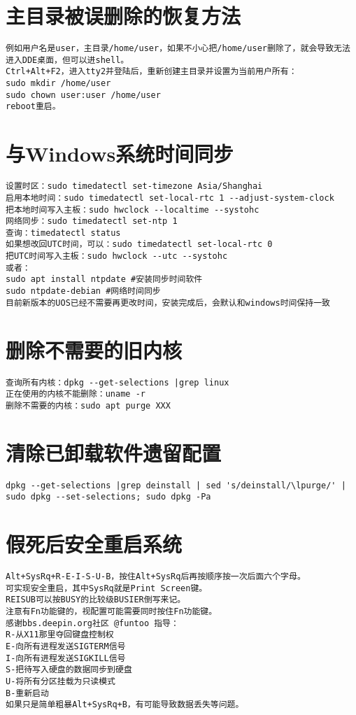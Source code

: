 \documentclass[a4paper,fontset=fandol,zihao=-4,linespread=1.2,oneside]{ctexbook}
\begin{document}
\section{主目录被误删除的恢复方法}
\begin{lstlisting}
例如用户名是user，主目录/home/user，如果不小心把/home/user删除了，就会导致无法进入DDE桌面，但可以进shell。
Ctrl+Alt+F2，进入tty2并登陆后，重新创建主目录并设置为当前用户所有：
sudo mkdir /home/user
sudo chown user:user /home/user
reboot重启。
\end{lstlisting}

\section{与Windows系统时间同步}
\begin{lstlisting}
设置时区：sudo timedatectl set-timezone Asia/Shanghai
启用本地时间：sudo timedatectl set-local-rtc 1 --adjust-system-clock
把本地时间写入主板：sudo hwclock --localtime --systohc
网络同步：sudo timedatectl set-ntp 1
查询：timedatectl status
如果想改回UTC时间，可以：sudo timedatectl set-local-rtc 0
把UTC时间写入主板：sudo hwclock --utc --systohc
或者：
sudo apt install ntpdate #安装同步时间软件
sudo ntpdate-debian #网络时间同步
目前新版本的UOS已经不需要再更改时间，安装完成后，会默认和windows时间保持一致
\end{lstlisting}

\section{删除不需要的旧内核}
\begin{lstlisting}
查询所有内核：dpkg --get-selections |grep linux
正在使用的内核不能删除：uname -r
删除不需要的内核：sudo apt purge XXX
\end{lstlisting}

\section{清除已卸载软件遗留配置}
\begin{lstlisting}
dpkg --get-selections |grep deinstall | sed 's/deinstall/\lpurge/' | sudo dpkg --set-selections; sudo dpkg -Pa
\end{lstlisting}

\section{假死后安全重启系统}
\begin{lstlisting}
Alt+SysRq+R-E-I-S-U-B，按住Alt+SysRq后再按顺序按一次后面六个字母。
可实现安全重启，其中SysRq就是Print Screen键。
REISUB可以按BUSY的比较级BUSIER倒写来记。
注意有Fn功能键的，视配置可能需要同时按住Fn功能键。
感谢bbs.deepin.org社区 @funtoo 指导：
R-从X11那里夺回键盘控制权
E-向所有进程发送SIGTERM信号
I-向所有进程发送SIGKILL信号
S-把待写入硬盘的数据同步到硬盘
U-将所有分区挂载为只读模式
B-重新启动
如果只是简单粗暴Alt+SysRq+B，有可能导致数据丢失等问题。
\end{lstlisting}
\end{document}
